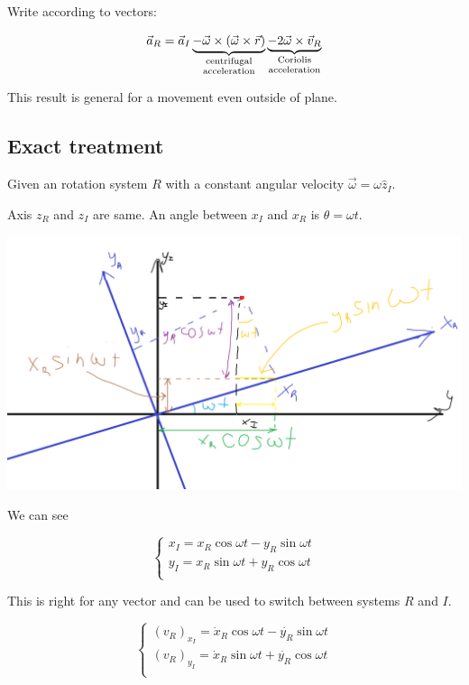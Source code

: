 Write according to vectors:

$$\vec{a}_R = \vec{a}_I \underbrace{-\vec{\omega}\times\left(\vec{\omega} \times \vec{r}\right)}_{\parbox{1.5cm}{\scriptsize  \centering  centrifugal \\ acceleration}} \underbrace{- 2\vec{\omega} \times \vec{v}_R}_{\parbox{1.5cm}{\scriptsize  \centering  Coriolis \\ acceleration}} $$

This result is general for a movement even outside of plane.

\subsection{Exact treatment}

Given an rotation system $R$ with a constant angular velocity $\vec{\omega} = \omega \hat{z}_I$.

Axis $z_R$ and $z_I$ are same. An angle between $x_I$ and $x_R$ is $\theta = \omega t$.

\begin{center}
	\includegraphics[width=\linewidth]{./lect7/pic1.png}
\end{center}

We can see 

$$\begin{cases*}
x_I =  x_R \cos \omega t - y_R \sin \omega t \\
y_I =  x_R \sin \omega t + y_R \cos \omega t \\
\end{cases*}$$

This is right for any vector and can be used to switch between systems $R$ and $I$.

$$\begin{cases*}
(v_R)_{x_I} =  \dot{x}_R \cos \omega t - \dot{y_R} \sin \omega t \\
(v_R)_{y_I} =  \dot{x}_R \sin \omega t + \dot{y_R} \cos \omega t \\
\end{cases*}$$

